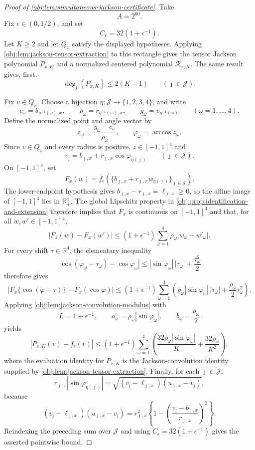 \documentclass[11pt]{article}
\begin{document}
\begin{proof}[Proof of \cref{obj:lem:simultaneous-jackson-certificate}]
Take
\[
A=2^{60}.
\]
Fix \(\epsilon\in(0,1/2)\), and set
\[
C_\epsilon=32(1+\epsilon^{-1}).
\]
Let \(K\ge2\) and let \(Q_x\) satisfy the displayed hypotheses. Applying
\cref{obj:lem:jackson-tensor-extraction} to this rectangle gives the tensor Jackson polynomial
\(P_{x,K}\) and a normalized centered polynomial \(\mathcal R_{x,K}\). The same result gives, first,
\[
\deg_{\jmath}(P_{x,K})\le 2(K-1)
\qquad(\jmath\in\mathcal J).
\]

Fix \(v\in Q_x\). Choose a bijection \(\eta:\mathcal J\to\{1,2,3,4\}\), and write
\[
c_\omega=b_{\eta^{-1}(\omega),x},
\qquad
\rho_\omega=r_{\eta^{-1}(\omega),x},
\qquad
y_\omega=v_{\eta^{-1}(\omega)}
\qquad(\omega=1,\ldots,4).
\]
Define the normalized point and angle vector by
\[
z_\omega=\frac{y_\omega-c_\omega}{\rho_\omega},
\qquad
\varphi_\omega=\arccos z_\omega .
\]
Since \(v\in Q_x\) and every radius is positive, \(z\in[-1,1]^4\) and
\[
v_{\jmath}=b_{\jmath,x}+r_{\jmath,x}\cos\varphi_{\eta(\jmath)}
\qquad(\jmath\in\mathcal J).
\]
On \([-1,1]^4\), set
\[
F_x(w)
=
\bar f_\epsilon\!\left(
\bigl\{b_{\jmath,x}+r_{\jmath,x}w_{\eta(\jmath)}\bigr\}_{\jmath\in\mathcal J}
\right).
\]
The lower-endpoint hypothesis gives \(b_{\jmath,x}-r_{\jmath,x}=\ell_{\jmath,x}\ge0\), so the affine image of
\([-1,1]^4\) lies in \(\mathbb R_+^4\). The global Lipschitz property in
\cref{obj:prop:identification-and-extension} therefore implies that \(F_x\) is continuous on
\([-1,1]^4\) and that, for all \(w,w'\in[-1,1]^4\),
\[
|F_x(w)-F_x(w')|
\le
(1+\epsilon^{-1})
\sum_{\omega=1}^4
\rho_\omega |w_\omega-w'_\omega|.
\]
For every shift \(\tau\in\mathbb R^4\), the elementary inequality
\[
|\cos(\varphi_\omega-\tau_\omega)-\cos\varphi_\omega|
\le
|\sin\varphi_\omega|\,|\tau_\omega|+\frac{\tau_\omega^2}{2}
\]
therefore gives
\[
\left|
F_x\{\cos(\varphi-\tau)\}-F_x(\cos\varphi)
\right|
\le
(1+\epsilon^{-1})
\sum_{\omega=1}^4
\left(
\rho_\omega|\sin\varphi_\omega|\,|\tau_\omega|
+\frac{\rho_\omega}{2}\tau_\omega^2
\right).
\]
Applying \cref{obj:lem:jackson-convolution-modulus} with
\[
L=1+\epsilon^{-1},
\qquad
a_\omega=\rho_\omega|\sin\varphi_\omega|,
\qquad
b_\omega=\frac{\rho_\omega}{2}
\]
yields
\[
|P_{x,K}(v)-\bar f_\epsilon(v)|
\le
(1+\epsilon^{-1})
\sum_{\omega=1}^4
\left(
\frac{32\rho_\omega|\sin\varphi_\omega|}{K}
+
\frac{32\rho_\omega}{K^2}
\right),
\]
where the evaluation identity for \(P_{x,K}\) is the Jackson-convolution identity supplied by
\cref{obj:lem:jackson-tensor-extraction}.
Finally, for each \(\jmath\in\mathcal J\),
\[
r_{\jmath,x}|\sin\varphi_{\eta(\jmath)}|
=
\sqrt{(v_{\jmath}-\ell_{\jmath,x})(u_{\jmath,x}-v_{\jmath})},
\]
because
\[
(v_{\jmath}-\ell_{\jmath,x})(u_{\jmath,x}-v_{\jmath})
=
r_{\jmath,x}^2
\left\{
1-\left(\frac{v_{\jmath}-b_{\jmath,x}}{r_{\jmath,x}}\right)^2
\right\}.
\]
Reindexing the preceding sum over \(\mathcal J\) and using
\(C_\epsilon=32(1+\epsilon^{-1})\) gives the asserted pointwise bound.


\end{proof}
\end{document}

